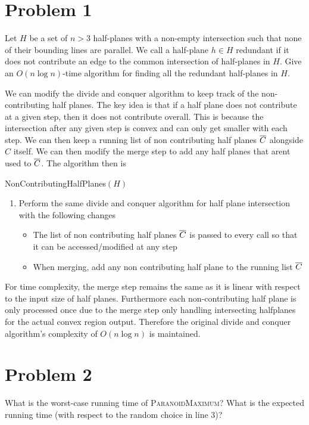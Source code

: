 \documentclass[12pt]{extarticle}
\begin{document}
\section*{Problem 1}
Let $H$ be a set of $n > 3$ half-planes with a non-empty intersection such that none of their bounding lines are parallel. We call a half-plane $h \in H$ redundant if it does not contribute an edge to the common intersection of half-planes in $H$. Give an $O(n \log n)$-time algorithm for finding all the redundant half-planes in $H$.

\begin{solution}
    We can modify the divide and conquer algorithm to keep track of the non-contributing half planes. The key idea is that if a half plane does not contribute at a given step, then it does not contribute overall. This is because the intersection after any given step is convex and can only get smaller with each step. We can then keep a running list of non contributing half planes $\overline{C}$ alongside $C$ itself. We can then modify the merge step to add any half planes that arent used to $\overline{C}$. The algorithm then is
    \begin{algorithm}[H]
        \caption{NonContributingHalfPlanes$(H)$}
        \begin{enumerate}
            \item Perform the same divide and conquer algorithm for half plane intersection with the following changes
            \begin{itemize}
                \item The list of non contributing half planes $\overline{C}$ is passed to every call so that it can be accessed/modified at any step
                \item When merging, add any non contributing half plane to the running list $\overline{C}$
            \end{itemize}
        \end{enumerate}
    \end{algorithm}

    For time complexity, the merge step remains the same as it is linear with respect to the input size of half planes. Furthermore each non-contributing half plane is only processed once due to the merge step only handling intersecting halfplanes for the actual convex region output. Therefore the original divide and conquer algorithm's complexity of $O(n \log n)$ is maintained.
\end{solution}

\section*{Problem 2}
What is the worst-case running time of \textsc{ParanoidMaximum}? What is the expected running time (with respect to the random choice in line 3)?
\end{document}
